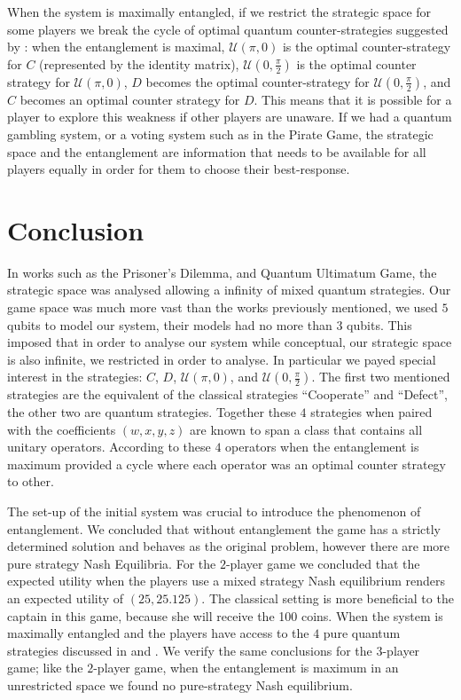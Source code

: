 \documentclass[10pt]{llncs}
\begin{document}
When the system is maximally entangled, if we restrict the strategic space for some players we break the cycle of optimal quantum counter-strategies suggested by \cite{Du}: when the entanglement is maximal, $\mathcal{U}(\pi, 0)$ is the optimal counter-strategy for $C$ (represented by the identity matrix), $\mathcal{U}(0, \frac{\pi}{2})$ is the optimal counter strategy for $\mathcal{U}(\pi, 0)$, $D$ becomes the optimal counter-strategy for $\mathcal{U}(0, \frac{\pi}{2})$, and $C$ becomes an optimal counter strategy for $D$. This means that it is possible for a player to explore this weakness if other players are unaware. If we had a quantum gambling system, or a voting system such as in the Pirate Game, the strategic space and the entanglement are information that needs to be available for all players equally in order for them to choose their best-response.



\section{Conclusion}


In works such as the Prisoner's Dilemma\cite{Letters2002}\cite{Eisert2008}, and Quantum Ultimatum Game\cite{Fra2011}, the strategic space was analysed allowing a infinity of mixed quantum strategies. Our game space was much more vast than the works previously mentioned, we used $5$ qubits to model our system, their models had no more than $3$ qubits. This imposed that in order to analyse our system while conceptual, our strategic space is also infinite, we restricted in order to analyse. In particular we payed special interest in the strategies: $C$, $D$, $\mathcal{U}(\pi, 0)$, and $\mathcal{U}(0, \frac{\pi}{2})$. The first two mentioned strategies are the equivalent of the classical strategies ``Cooperate'' and ``Defect'', the other two are quantum strategies. Together these $4$ strategies when paired with the coefficients $(w,x,y,z)$ are known to span a class that contains all unitary operators. According to \cite{Du} these $4$ operators when the entanglement is maximum provided a cycle where each operator was an optimal counter strategy to other. 

The set-up of the initial system was crucial to introduce the phenomenon of entanglement. We concluded that without entanglement the game has a strictly determined solution and behaves as the original problem, however there are more pure strategy Nash Equilibria.
For the $2$-player game we concluded that the expected utility when the players use a mixed strategy Nash equilibrium renders an expected utility of $(25, 25.125)$. The classical setting is more beneficial to the captain in this game, because she will receive the 100 coins. When the system is maximally entangled and the players have access to the $4$ pure quantum strategies discussed in \cite{Du} and \cite{Letters2002}. We verify the same conclusions for the $3$-player game; like the $2$-player game, when the entanglement is maximum in an unrestricted space we found no pure-strategy Nash equilibrium.
\end{document}
